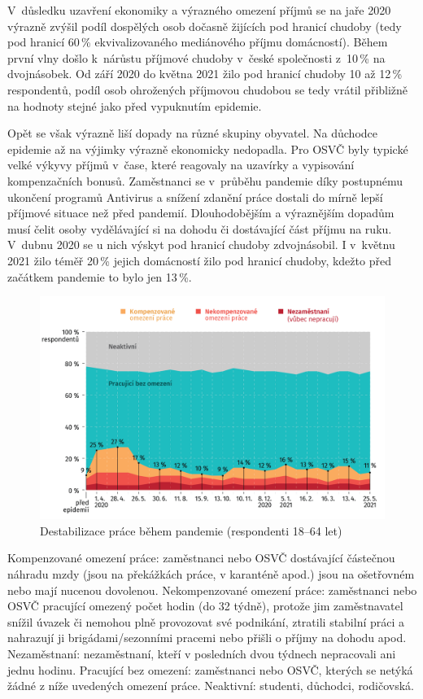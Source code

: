 V důsledku uzavření ekonomiky a výrazného omezení příjmů se na jaře 2020 výrazně zvýšil podíl dospělých osob dočasně žijících pod hranicí chudoby (tedy pod hranicí 60\,\% ekvivalizovaného mediánového příjmu domácností). Během první vlny došlo k nárůstu
příjmové chudoby v české společnosti z 10\,\% na dvojnásobek. Od září 2020 do května 2021 žilo pod hranicí chudoby 10 až 12\,\% respondentů, podíl osob ohrožených příjmovou chudobou se tedy vrátil přibližně na hodnoty stejné jako před vypuknutím epidemie.

Opět se však výrazně liší dopady na různé skupiny obyvatel. Na důchodce epidemie až na výjimky výrazně ekonomicky nedopadla. Pro OSVČ byly typické velké výkyvy příjmů v čase, které reagovaly na uzavírky a vypisování kompenzačních bonusů. Zaměstnanci se v průběhu pandemie díky postupnému ukončení programů Antivirus a snížení zdanění práce dostali do mírně lepší příjmové situace než před pandemií. Dlouhodobějším a výraznějším dopadům musí čelit osoby vydělávající si na dohodu či dostávající část příjmu na ruku. V dubnu 2020 se u nich výskyt pod hranicí chudoby zdvojnásobil. I v květnu 2021 žilo téměř 20\,\% jejich domácností žilo pod hranicí chudoby, kdežto před začátkem pandemie to bylo jen 13\,\%.


\begin{figure}[ht]
    \centering
    \includegraphics[width=\textwidth]{./pic/zbp-graf1.png}
    \caption{Destabilizace práce během pandemie (respondenti 18--64 let)}
    \label{fig:zbp1}
\end{figure}

Kompenzované omezení práce: zaměstnanci nebo OSVČ dostávající částečnou náhradu mzdy (jsou na překážkách práce, v karanténě apod.) jsou na ošetřovném nebo mají nucenou dovolenou. Nekompenzované omezení práce: zaměstnanci nebo OSVČ pracující omezený počet hodin (do 32 týdně), protože jim zaměstnavatel snížil úvazek či nemohou plně provozovat své podnikání, ztratili stabilní práci a nahrazují ji brigádami/sezonními pracemi nebo přišli o příjmy na dohodu apod. Nezaměstnaní: nezaměstnaní, kteří v posledních dvou týdnech nepracovali ani jednu hodinu. Pracující bez omezení: zaměstnanci nebo OSVČ, kterých se netýká žádné z níže uvedených omezení práce. Neaktivní: studenti, důchodci, rodičovská.

